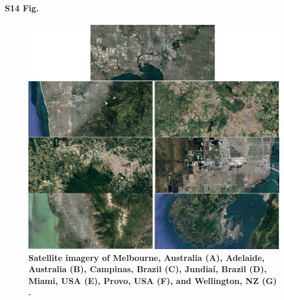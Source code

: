 \documentclass[10pt,letterpaper,hidelinks]{article}
\begin{document}
\paragraph*{S14 Fig.}
\begin{figure}[!htbp]
\centering    
\includegraphics[scale=0.35]{Images/PlosOne/Fig14.png} 
 \caption{\bf Satellite imagery of Melbourne, Australia (A), Adelaide, Australia (B), Campinas, Brazil (C), Jundia\'{i}, Brazil (D), Miami, USA (E), Provo, USA (F), and Wellington, NZ (G) \cite{GoogleStatic2017}.}    
 \label{fig:satimages}  
\end{figure} 
\end{document}
